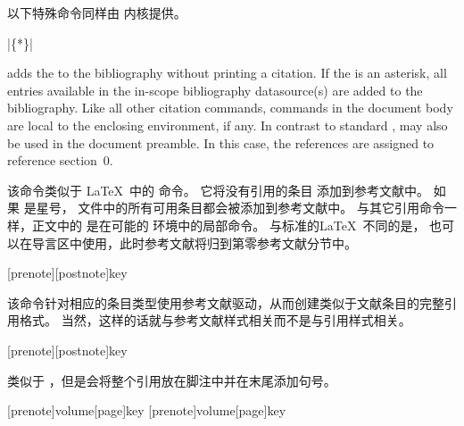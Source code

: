 
以下特殊命令同样由 \biblatex 内核提供。

\begin{ltxsyntax}

|\{*\}|

adds the  to the bibliography without printing a citation. If the
 is an asterisk, all entries available in the in-scope bibliography datasource(s) are added to the bibliography. Like all other citation commands,  commands in the document body are local to the enclosing  environment, if any. In contrast to standard \latex,  may also be used in the document preamble. In this case, the references are assigned to reference section~0.

该命令类似于 \LaTeX\ 中的  命令。
它将没有引用的条目  添加到参考文献中。
如果  是星号， 文件中的所有可用条目都会被添加到参考文献中。
与其它引用命令一样，正文中的  是在可能的  环境中的局部命令。
与标准的\LaTeX\ 不同的是， 也可以在导言区中使用，此时参考文献将归到第零参考文献分节中。

[prenote][postnote]{key}


该命令针对相应的条目类型使用参考文献驱动，从而创建类似于文献条目的完整引用格式。
当然，这样的话就与参考文献样式相关而不是与引用样式相关。

[prenote][postnote]{key}


类似于 ，但是会将整个引用放在脚注中并在末尾添加句号。

[prenote]{volume}[page]{key}
[prenote]{volume}[page]{key}



\end{ltxsyntax}
